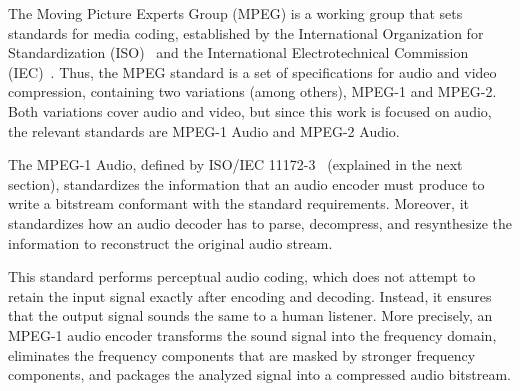 The Moving Picture Experts Group (MPEG) is a working group that sets standards for media coding, established by the International Organization for Standardization (ISO)~\cite{iso} and the International Electrotechnical Commission (IEC)~\cite{iec}. Thus, the MPEG standard is a set of specifications for audio and video compression, containing two variations (among others), MPEG-1 and MPEG-2. Both variations cover audio and video, but since this work is focused on audio, the relevant standards are MPEG-1 Audio and MPEG-2 Audio.

The MPEG-1 Audio, defined by ISO/IEC 11172-3~\cite{11172} (explained in the next section), standardizes the information that an audio encoder must produce to write a bitstream conformant with the standard requirements. Moreover, it standardizes how an audio decoder has to parse, decompress, and resynthesize the information to reconstruct the original audio stream.

This standard performs perceptual audio coding, which does not attempt to retain the input signal exactly after encoding and decoding. Instead, it ensures that the output signal sounds the same to a human listener. %
More precisely, an MPEG-1 audio encoder transforms the sound signal into the frequency domain, eliminates the frequency components that are masked by stronger frequency components, and packages the analyzed signal into a compressed audio bitstream.

